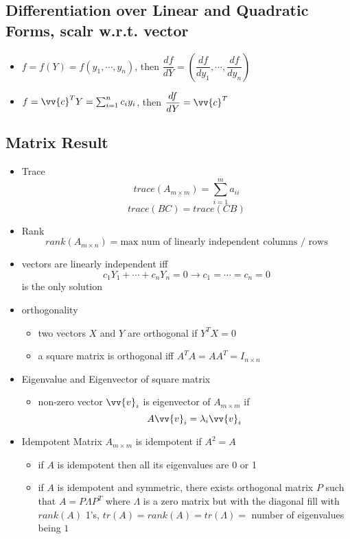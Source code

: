 \documentclass[11pt]{article}
\newcommand{\vc}{\vv{c}}
\newcommand{\vvv}{{\vv{v}}}
\begin{document}
\subsection*{Differentiation over Linear and Quadratic Forms, scalr w.r.t. vector}
\begin{itemize}
    \item $f=f(Y)=f(y_1,\cdots,y_n)$, then $\dfrac{df}{dY}=(\dfrac{df}{dy_1},\cdots,\dfrac{df}{dy_n})$
    \item $f=\vc^TY=\sum_{i=1}^{n}c_iy_i$, then $\dfrac{df}{dY}=\vc^T$
\end{itemize}
\subsection*{Matrix Result}
\begin{itemize}
    \item Trace \[trace(A_{m\times m})=\sum_{i=1}^{m}a_{ii}\] \[trace(BC)=trace(CB)\]
    \item Rank \[rank(A_{m\times n})=\text{max num of linearly independent columns / rows}\]
    \item vectors are linearly independent iff \[c_1Y_1+\cdots+c_nY_n=0\rightarrow c_1=\cdots=c_n=0\] is the only solution 
    \item orthogonality
    \begin{itemize}
        \item two vectors $X$ and $Y$ are orthogonal if $Y^TX=0$
        \item a square matrix is orthogonal iff $A^TA=AA^T=I_{n\times n}$
    \end{itemize}
    \item Eigenvalue and Eigenvector of square matrix 
    \begin{itemize}
        \item non-zero vector $\vvv_i$ is eigenvector of $A_{m\times m}$ if \[A\vvv_i=\lambda_i\vvv_i\]
    \end{itemize}
    \item Idempotent Matrix $A_{m\times m}$ is idempotent if $A^2=A$
    \begin{itemize}
        \item if $A$ is idempotent then all its eigenvalues are 0 or 1
        \item if $A$ is idempotent and symmetric, there exists orthogonal matrix $P$ such that $A=P\Lambda P^T$ where $\Lambda$ is a zero matrix but with the diagonal fill with $rank(A)$ 1's, $tr(A)=rank(A)=tr(\Lambda)=$ number of eigenvalues being $1$
    \end{itemize}
\end{itemize}
\end{document}
